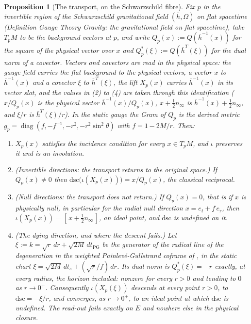 \documentclass[11pt]{article}
\newtheorem{proposition}[theorem]{Proposition}
\theoremstyle{definition}
\theoremstyle{plain}
\newcommand{\changedmark}[2]{\marginpar{\raggedright\scriptsize\color{#1}#2}}
\providecommand{\dsc}{}\renewcommand{\dsc}{\mathrm{dsc}}
\providecommand{\er}{}\renewcommand{\er}{e_r}
\providecommand{\et}{}\renewcommand{\et}{e_t}
\providecommand{\hb}{}\renewcommand{\hb}{\bar{h}}
\providecommand{\nInf}{}\renewcommand{\nInf}{n_\infty}
\begin{document}
\begin{proposition}[The transport, on the Schwarzschild fibre]\label{c:singularity.transport-schwarzschild-fibre}
\changedmark{gray}{reworded}
Fix $p$ in the invertible region of the Schwarzschild gravitational field $(\hb, \Omega)$ on flat spacetime (Definition \emph{Gauge Theory Gravity: the gravitational field on flat spacetime}), take $T_pM$ to be the background vectors at $p$, and write $Q_p(x) := Q(\hb^{-1}(x))$ for the square of the physical vector over $x$ and $Q^*_p(\xi) := Q(\hb^{T}(\xi))$ for the dual norm of a covector. Vectors and covectors are read in the physical space: the gauge field carries the flat background to the physical vectors, a vector $x$ to $\hb^{-1}(x)$ and a covector $\xi$ to $\hb^{T}(\xi)$, the lift $X_p(x)$ carries $\hb^{-1}(x)$ in its vector slot, and the values in (2) to (4) are taken through this identification ($x/Q_p(x)$ is the physical vector $\hb^{-1}(x)/Q_p(x)$, $x + \tfrac12 \nInf$ is $\hb^{-1}(x) + \tfrac12 \nInf$, and $\xi/r$ is $\hb^{T}(\xi)/r$). In the static gauge the Gram of $Q_p$ is the derived metric $g_p = \operatorname{diag}(f, -f^{-1}, -r^2, -r^2\sin^2\theta)$ with $f = 1 - 2M/r$. Then:
\begin{enumerate}
\item[(1)] $X_p(x)$ satisfies the incidence condition for every $x \in T_pM$, and $\iota$ preserves it and is an involution.
\item[(2)] \emph{(Invertible directions: the transport returns to the original space.)} If $Q_p(x) \neq 0$ then $\dsc\bigl(\iota(X_p(x))\bigr) = x/Q_p(x)$, the classical reciprocal.
\item[(3)] \emph{(Null directions: the transport does not return.)} If $Q_p(x) = 0$, that is if $x$ is physically null, in particular for the radial null direction $x = \et + f\,\er$, then $\iota(X_p(x)) = [\,x + \tfrac12 \nInf\,]$, an ideal point, and $\dsc$ is undefined on it.
\item[(4)] \emph{(The dying direction, and where the descent fails.)} Let $\xi := k = \sqrt r\,dr + \sqrt{2M}\,dt_{\mathrm{PG}}$ be the generator of the radical line of the degeneration in the weighted Painlev\'e-Gullstrand coframe of \cite[Thm.~8.7]{ButlerT4}, in the static chart $\xi = \sqrt{2M}\,dt_s + (\sqrt r/f)\,dr$. Its dual norm is $Q^*_p(\xi) = -r$ exactly, at every radius, the horizon included: nonzero for every $r > 0$ and tending to $0$ as $r \to 0^+$. Consequently $\iota(X_p(\xi))$ descends at every point $r > 0$, to $\dsc = -\xi/r$, and converges, as $r \to 0^+$, to an ideal point at which $\dsc$ is undefined. The read-out fails exactly on $E$ and nowhere else in the physical closure.
\end{enumerate}
\end{proposition}
\end{document}
